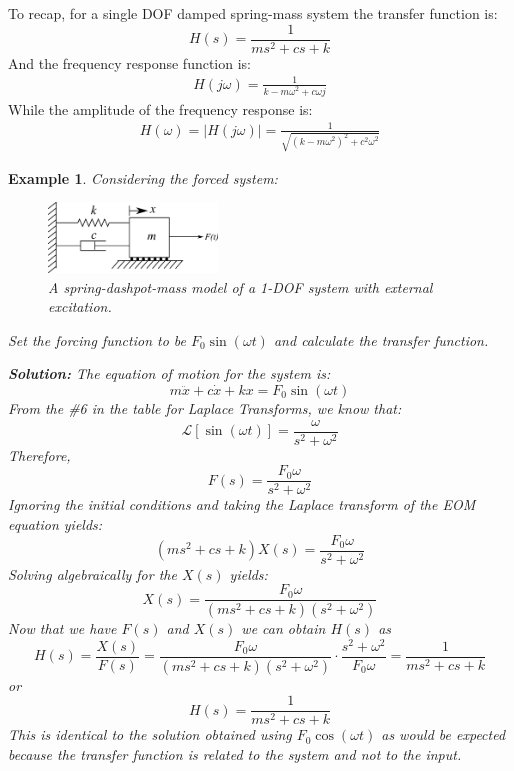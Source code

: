 \documentclass[12pt,letter]{article}
\newtheorem{ex}{Example}
\numberwithin{ex}{section} %
\newenvironment{example}{\begin{mdframed}[middlelinewidth=0.5mm]\begin{ex}\normalfont}{\end{ex}\end{mdframed}}
\numberwithin{re}{section} %
\newcommand{\Laplace}[1]{\ensuremath{\mathcal{L}{\left[#1\right]}}}
\numberwithin{equation}{section}	%
\begin{document}
To recap, for a single DOF damped spring-mass system the transfer function is:
\begin{equation}
H(s) = \frac{1}{ms^2+cs+k}
\end{equation}
And the frequency response function is:
\begin{eqnarray}
H(j\omega) = \frac{1}{k-m\omega^2+c\omega j}
\end{eqnarray}
While the amplitude of the frequency response is:
\begin{eqnarray}
H(\omega) = |H(j\omega)| = \frac{1}{\sqrt{(k-m\omega^2)^2+c^2\omega^2}}
\end{eqnarray}

\begin{example}
	Considering the forced system:
	\begin{figure}[H]
		\centering
		\includegraphics[width=0.4\textwidth]{../figures/1-DOF-spring_dashpot_mass_horizontal_forced.png}
		\caption{A spring-dashpot-mass model of a 1-DOF system with external excitation.}
	\end{figure}
	Set the forcing function to be $F_0 \sin(\omega t)$ and calculate the transfer function. 
	
	\noindent\textbf{Solution:} The equation of motion for the system is:
	\begin{equation}
		m\ddot{x} + c\dot{x} +kx = F_0 \sin(\omega t)
	\end{equation}
	From the \#6 in the table for Laplace Transforms, we know that:
	\begin{equation}
		\Laplace{\sin(\omega t)} = \frac{\omega}{s^2+\omega^2}
	\end{equation}
	Therefore, 
	\begin{equation}
	F(s) = \frac{F_0\omega}{s^2+\omega^2}
	\end{equation}
	Ignoring the initial conditions and taking the Laplace transform of the EOM equation yields:
	\begin{equation}
	(ms^2 + cs +k)X(s) = \frac{F_0 \omega}{s^2+\omega^2} 
	\end{equation}
	Solving algebraically for the $X(s)$ yields: 
	\begin{equation}
	X(s) = \frac{F_0\omega}{(ms^2 + cs +k)(s^2+\omega^2)}
	\end{equation}
	Now that we have $F(s)$ and $X(s)$ we can obtain $H(s)$ as  
	\begin{equation}
	H(s) = \frac{X(s)}{F(s)} = \frac{F_0 \omega }{(ms^2 + cs +k)(s^2+\omega^2)} \cdot \frac{s^2+\omega^2}{F_0 \omega} = \frac{1}{ms^2+cs+k}
	\end{equation}
	or 
	\begin{equation}
	H(s) = \frac{1}{ms^2+cs+k}
	\end{equation}
	This is identical to the solution obtained using $F_0 \cos(\omega t)$ as would be expected because the transfer function is related to the system and not to the input. 
\end{example}  
\end{document}
